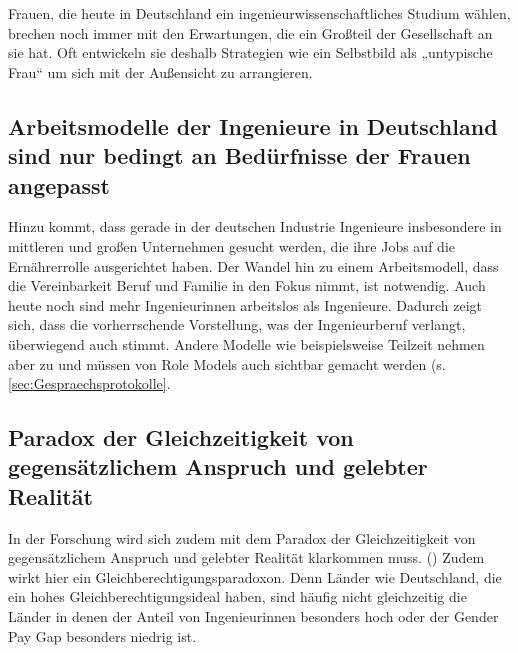 \documentclass[a4paper, 12 pt]{IEEEtran}
\begin{document}
Frauen, die heute in Deutschland ein ingenieurwissenschaftliches Studium wählen, brechen noch immer mit den Erwartungen, die ein Großteil der Gesellschaft an sie hat. Oft entwickeln sie deshalb Strategien wie ein Selbstbild als „untypische Frau“ um sich mit der Außensicht zu arrangieren.  

\subsection{Arbeitsmodelle der Ingenieure in Deutschland sind nur bedingt an Bedürfnisse der Frauen angepasst}
Hinzu kommt, dass gerade in der deutschen Industrie Ingenieure insbesondere in mittleren und großen Unternehmen gesucht werden, die ihre Jobs auf die Ernährerrolle ausgerichtet haben. Der Wandel hin zu einem Arbeitsmodell, dass die Vereinbarkeit Beruf und Familie in den Fokus nimmt, ist notwendig. Auch heute noch sind mehr Ingenieurinnen arbeitslos als Ingenieure. Dadurch zeigt sich, dass die vorherrschende Vorstellung, was der Ingenieurberuf verlangt, überwiegend auch stimmt. Andere Modelle wie beispielsweise Teilzeit nehmen aber zu und müssen von Role Models auch sichtbar gemacht werden (s. \ref{sec:Gespraechsprotokolle}.



\subsection{Paradox der Gleichzeitigkeit von gegensätzlichem Anspruch und gelebter Realität}
In der Forschung wird sich zudem mit dem Paradox der Gleichzeitigkeit von gegensätzlichem Anspruch und gelebter Realität klarkommen muss. (\cite{Weisenburger.07.03.2021}) Zudem wirkt hier ein Gleichberechtigungsparadoxon. Denn Länder wie Deutschland, die ein hohes Gleichberechtigungsideal haben, sind häufig nicht gleichzeitig die Länder in denen der Anteil von Ingenieurinnen besonders hoch oder der Gender Pay Gap besonders niedrig ist. 
\end{document}

